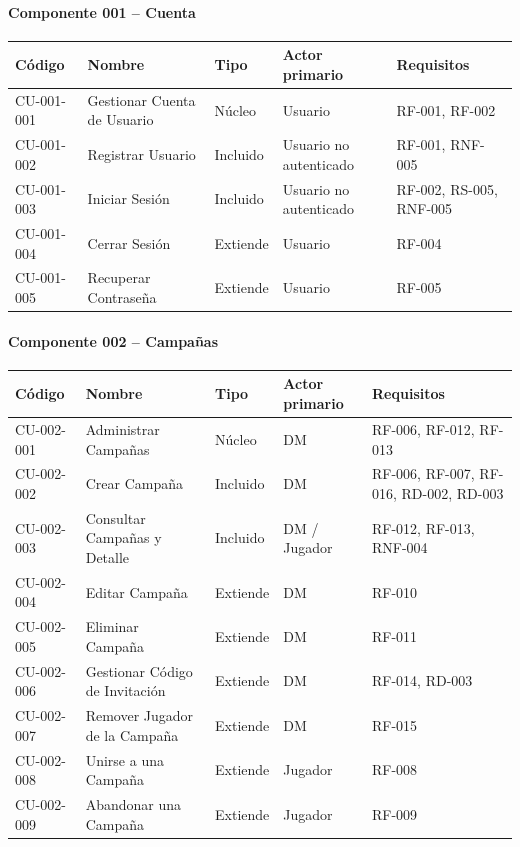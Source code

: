\paragraph{Componente 001 -- Cuenta}
{\footnotesize\setlength{\tabcolsep}{4pt}\renewcommand{\arraystretch}{1.15}
\begin{longtable}{|>{\raggedright\arraybackslash}p{1.9cm}|>{\raggedright\arraybackslash}p{4.4cm}|>{\raggedright\arraybackslash}p{1.7cm}|>{\raggedright\arraybackslash}p{2.5cm}|>{\raggedright\arraybackslash}p{4.0cm}|}
\hline
\textbf{Código} & \textbf{Nombre} & \textbf{Tipo} & \textbf{Actor primario} & \textbf{Requisitos} \\ \hline\endhead
CU-001-001 & Gestionar Cuenta de Usuario & Núcleo & Usuario & RF-001, RF-002 \\ \hline
CU-001-002 & Registrar Usuario & Incluido & Usuario no autenticado & RF-001, RNF-005 \\ \hline
CU-001-003 & Iniciar Sesión & Incluido & Usuario no autenticado & RF-002, RS-005, RNF-005 \\ \hline
CU-001-004 & Cerrar Sesión & Extiende & Usuario & RF-004 \\ \hline
CU-001-005 & Recuperar Contraseña & Extiende & Usuario & RF-005 \\ \hline
\end{longtable}}
\paragraph{Componente 002 -- Campañas}
{\footnotesize\setlength{\tabcolsep}{4pt}\renewcommand{\arraystretch}{1.15}
\begin{longtable}{|>{\raggedright\arraybackslash}p{1.9cm}|>{\raggedright\arraybackslash}p{4.4cm}|>{\raggedright\arraybackslash}p{1.7cm}|>{\raggedright\arraybackslash}p{2.5cm}|>{\raggedright\arraybackslash}p{4.0cm}|}
\hline
\textbf{Código} & \textbf{Nombre} & \textbf{Tipo} & \textbf{Actor primario} & \textbf{Requisitos} \\ \hline\endhead
CU-002-001 & Administrar Campañas & Núcleo & DM & RF-006, RF-012, RF-013 \\ \hline
CU-002-002 & Crear Campaña & Incluido & DM & RF-006, RF-007, RF-016, RD-002, RD-003 \\ \hline
CU-002-003 & Consultar Campañas y Detalle & Incluido & DM / Jugador & RF-012, RF-013, RNF-004 \\ \hline
CU-002-004 & Editar Campaña & Extiende & DM & RF-010 \\ \hline
CU-002-005 & Eliminar Campaña & Extiende & DM & RF-011 \\ \hline
CU-002-006 & Gestionar Código de Invitación & Extiende & DM & RF-014, RD-003 \\ \hline
CU-002-007 & Remover Jugador de la Campaña & Extiende & DM & RF-015 \\ \hline
CU-002-008 & Unirse a una Campaña & Extiende & Jugador & RF-008 \\ \hline
CU-002-009 & Abandonar una Campaña & Extiende & Jugador & RF-009 \\ \hline
\end{longtable}}
